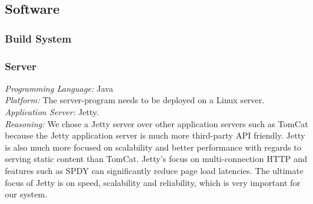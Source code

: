 \subsection{Software}

\subsubsection{Build System}


\subsubsection{Server}
\textit{Programming Language:} Java \\
\textit{Platform:} The server-program needs to be deployed on a Linux server.\\
\textit{Application Server:} Jetty.\\
\textit{Reasoning: } We chose a Jetty server over other application servers such as TomCat because the Jetty application server is much more third-party API friendly. Jetty is also much more focused on scalability and better performance with regards to serving static content than TomCat. Jetty's focus on multi-connection HTTP and features such as SPDY can significantly reduce page load latencies. The ultimate focus of Jetty is on speed, scalability and reliability, which is very important for our system.

